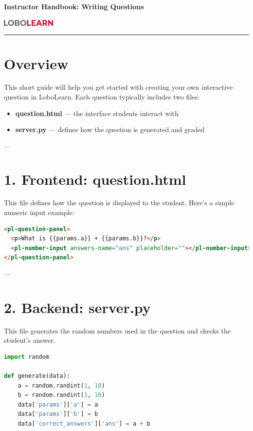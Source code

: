 \documentclass[12pt]{article}
\begin{document}
\begin{center}
    {\LARGE \bfseries \color{UNMRed}Instructor Handbook: Writing Questions}

    \vspace{1em}
    \includegraphics[width=0.20\textwidth]{logo_bold.png}
\end{center}

\vspace{-1em}
\noindent\rule{\linewidth}{1pt}

\section*{Overview}
This short guide will help you get started with creating your own interactive question in LoboLearn. Each question typically includes two files:

\begin{itemize}
    \item \textbf{question.html} — the interface students interact with
    \item \textbf{server.py} — defines how the question is generated and graded
\end{itemize}

---

\section*{1. Frontend: question.html}
This file defines how the question is displayed to the student. Here's a simple numeric input example:

\begin{lstlisting}[language=HTML]
<pl-question-panel>
  <p>What is {{params.a}} + {{params.b}}?</p>
  <pl-number-input answers-name="ans" placeholder=""></pl-number-input>
</pl-question-panel>
\end{lstlisting}

---

\section*{2. Backend: server.py}
This file generates the random numbers used in the question and checks the student's answer.

\begin{lstlisting}[language=Python]
import random

def generate(data):
    a = random.randint(1, 10)
    b = random.randint(1, 10)
    data['params']['a'] = a
    data['params']['b'] = b
    data['correct_answers']['ans'] = a + b
\end{lstlisting}
\end{document}
